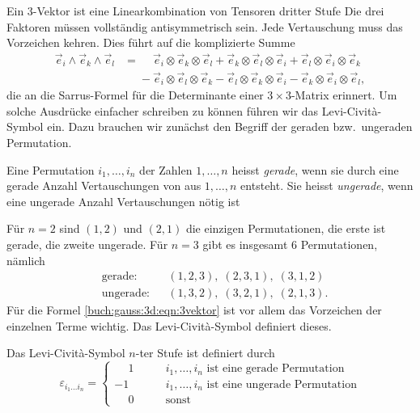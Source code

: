 Ein 3-Vektor ist eine Linearkombination von Tensoren dritter Stufe
Die drei Faktoren müssen vollständig antisymmetrisch sein.
Jede Vertauschung muss das Vorzeichen kehren.
Dies führt auf die komplizierte Summe
\begin{align}
\vec{e}_i
\wedge
\vec{e}_k
\wedge
\vec{e}_l
&=
\phantom{+}
\vec{e}_i\otimes\vec{e}_k\otimes\vec{e}_l
+
\vec{e}_k\otimes\vec{e}_l\otimes\vec{e}_i
+
\vec{e}_l\otimes\vec{e}_i\otimes\vec{e}_k
\\
&\phantom{=}
-
\vec{e}_i\otimes\vec{e}_l\otimes\vec{e}_k
-
\vec{e}_l\otimes\vec{e}_k\otimes\vec{e}_i
-
\vec{e}_k\otimes\vec{e}_i\otimes\vec{e}_l,
\label{buch:gauss:3d:eqn:3vektor}
\end{align}
die an die Sarrus-Formel für die Determinante einer $3\times 3$-Matrix
erinnert.
Um solche Ausdrücke einfacher schreiben zu können führen wir das
Levi-Cività-Symbol ein.
Dazu brauchen wir zunächst den Begriff der geraden bzw.~ungeraden
Permutation.

\begin{definition}
Eine Permutation $i_1,\dots,i_n$ der Zahlen $1,\dots,n$ heisst {\em gerade},
wenn sie durch eine gerade Anzahl Vertauschungen von aus $1,\dots,n$
entsteht.
Sie heisst {\em ungerade}, wenn eine ungerade Anzahl Vertauschungen
nötig ist
%
%
\end{definition}

Für $n=2$ sind $(1,2)$ und $(2,1)$ die einzigen Permutationen,
die erste ist gerade, die zweite ungerade.
Für $n=3$ gibt es insgesamt 6 Permutationen, nämlich
\[
\begin{aligned}
&\text{gerade:}  &&(1,2,3),\;(2,3,1),\;(3,1,2)\\
&\text{ungerade:}&&(1,3,2),\;(3,2,1),\;(2,1,3).
\end{aligned}
\]
Für die Formel \eqref{buch:gauss:3d:eqn:3vektor} ist vor allem
das Vorzeichen der einzelnen Terme wichtig.
Das Levi-Cività-Symbol definiert dieses.

\begin{definition}
Das Levi-Cività-Symbol $n$-ter Stufe ist definiert durch
\[
\varepsilon_{i_1\dots i_n}
=
\begin{cases}
\phantom{-}1&\qquad\text{$i_1,\dots,i_n$ ist eine gerade Permutation}\\
         - 1&\qquad\text{$i_1,\dots,i_n$ ist eine ungerade Permutation}\\
\phantom{-}0&\qquad\text{sonst}
\end{cases}
\]
\end{definition}


